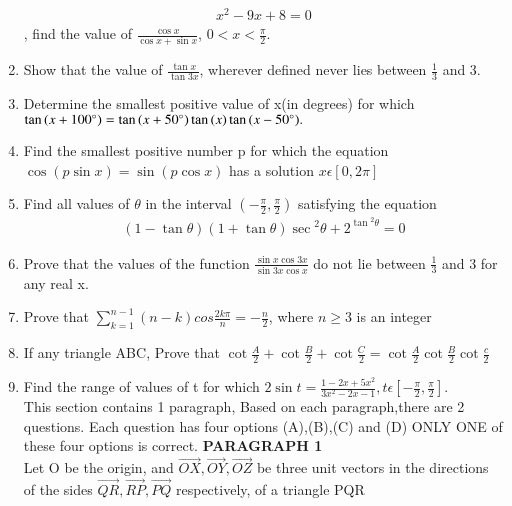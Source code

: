 \begin{enumerate}[label=\arabic*.,ref=\thesubsection.\theenumi]
\begin{align}
        x^2 - 9x + 8 =0
    \end{align}, find the value of $\frac{\cos{x}}{\cos{x}+\sin{x}}$, $0< x<\frac{\pi}{2}.$\\
    \item Show that the value of $\frac{\tan{x}}{\tan{3x}}$, wherever defined never lies between $\frac{1}{3}$ and 3.
    \item Determine the smallest positive value of x(in degrees) for which $\tan{(x+100\degree)} = \tan{(x+50\degree)}\tan{(x)}\tan{(x-50\degree)}.$
    \item Find the smallest positive number p for which the equation $\cos{(p\sin{x})} = \sin{(p\cos{x})}$ has a solution  $x\epsilon [0 , 2\pi]$
    \item Find all values of $\theta$ in the interval $(-\frac{\pi}{2},\frac{\pi}{2})$ satisfying the equation \begin{align}
        (1-\tan{\theta})(1+\tan{\theta})\sec{^2\theta} + 2^{\tan{^2\theta}} = 0
    \end{align}
    \item Prove that the values of the function $\frac{\sin{x} \cos{3x}}{\sin{3x}\cos{x}}$ do not lie between $\frac{1}{3}$ and 3 for any real x.
    \item Prove that $\sum_{k=1}^{n-1}(n-k) cos {\frac{2k\pi}{n}} = -\frac{n}{2}$, where $n\geq3$ is an integer
    \item If any triangle ABC, Prove that 
    $\cot{\frac{A}{2}}+\cot{\frac{B}{2}}+\cot{\frac{C}{2}}=\cot{\frac{A}{2}}\cot{\frac{B}{2}}\cot{\frac{c}{2}}$
    \item Find the range of values of t for which $2 \sin{t} = {\frac{1-2x+5x^2}{3x^2-2x-1}}, t \epsilon [{-\frac{\pi}{2}},{\frac{\pi}{2}}].$\\           

This section contains 1 paragraph, Based on each paragraph,there are 2 questions. Each question has four options (A),(B),(C) and (D) ONLY ONE of these four options is correct.
{\center\textbf{PARAGRAPH 1}}\\
Let O be the origin, and $\vec {OX},\vec {OY},\vec {OZ}$ be three unit vectors in the directions of the sides $\vec {QR},\vec {RP},\vec {PQ}$ respectively, of a triangle PQR


\end{enumerate}
